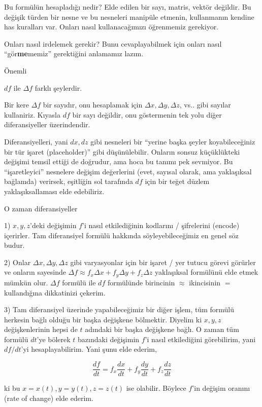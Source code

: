 \documentclass[12pt,fleqn]{article}\usepackage{../../common}
\begin{document}
Bu formülün hesapladığı nedir? Elde edilen bir sayı, matris, vektör
değildir. Bu değişik türden bir nesne ve bu nesneleri manipüle etmenin,
kullanmanın kendine has kuralları var. Onları nasıl kullanacağımızı
öğrenmemiz gerekiyor. 

Onları nasıl irdelemek gerekir? Bunu cevaplayabilmek için onları nasıl
``gör\textbf{me}memiz'' gerektiğini anlamamız lazım. 

Önemli

$df$ ile $\Delta f$ farklı şeylerdir.

Bir kere $\Delta f$ bir sayıdır, onu hesaplamak için $\Delta x, \Delta y,
\Delta z$, vs.. gibi sayılar kullaniriz. Kıyasla $df$ bir sayı değildir, 
onu göstermenin tek yolu diğer diferansiyeller üzerindendir. 

Diferansiyelleri, yani $dx, dz$ gibi nesneleri bir ``yerine başka şeyler
koyabileceğiniz bir tür işaret (placeholder)'' gibi düşünülebilir. Onların
sonsuz küçüklükteki değişimi temsil ettiği de doğrudur, ama hoca bu tanımı
pek sevmiyor. Bu ``işaretleyici'' nesnelere değişim değerlerini (evet,
sayısal olarak, ama yaklaşıksal bağlamda) verirsek, eşitliğin sol tarafında
$df$ için bir teğet düzlem yaklaşıksallaması elde edebiliriz.

O zaman diferansiyeller 

1) $x,y,z$'deki değişimin $f$'i nasıl etkilediğinin kodlarını / şifrelerini
(encode) içerirler. Tam diferansiyel formülü hakkında söyleyebileceğimiz en
genel söz budur.

2) Onlar $\Delta x, \Delta y, \Delta z$ gibi varyasyonlar için bir işaret /
yer tutucu görevi görürler ve onların sayesinde $\Delta f \approx f_x\Delta
x + f_y \Delta y + f_z \Delta z$ yaklaşıksal formülünü elde etmek mümkün
olur. $\Delta f$ formülü ile $df$ formülünde birincinin $\approx$
ikincisinin $=$ kullandığına dikkatinizi çekerim.

3) Tam diferansiyel üzerinde yapabileceğimiz bir diğer işlem, tüm formülü
herkesin bağlı olduğu bir başka değişkene bölmektir. Diyelim ki $x,y,z$
değişkenlerinin hepsi de $t$ adındaki bir başka değişkene bağlı. O zaman
tüm formülü $dt$'ye bölerek $t$ bazındaki değişimin $f$'i nasıl
etkilediğini görebilirim, yani $df/dt$'yi hesaplayabilirim. Yani şunu elde
ederim, 

$$ \frac{df}{dt} = f_x\frac{dx}{dt} + f_y\frac{dy}{dt} + f_z\frac{dz}{dt} $$

ki bu $x=x(t),y=y(t),z=z(t)$ ise olabilir. Böylece $f$'in değişim oranını
(rate of change) elde ederim. 
\end{document}
